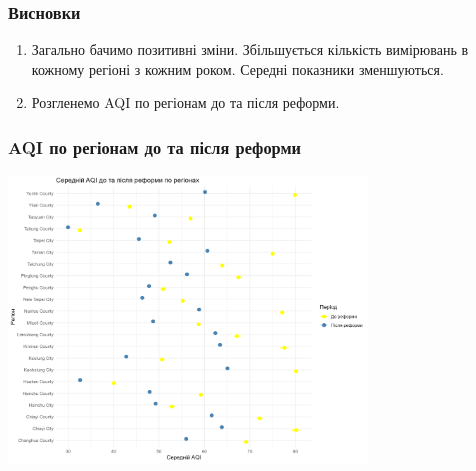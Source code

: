 \documentclass{beamer}
\begin{document}
\begin{frame}
  \frametitle{Висновки}

  \begin{enumerate}
    \item Загально бачимо позитивні зміни. 
    Збільшується кількість вимірювань в кожному регіоні з кожним роком. 
    Середні показники зменшуються.
    \item Розгленемо AQI по регіонам до та після реформи.
  \end{enumerate}

  
\end{frame}

\begin{frame}
  \frametitle{AQI по регіонам до та після реформи}

  \begin{center}
    \includegraphics[height=3in]{./plots/lab2/1-4-part/aqi_comparison_before_after.png}
  \end{center}

\end{frame}
\end{document}
